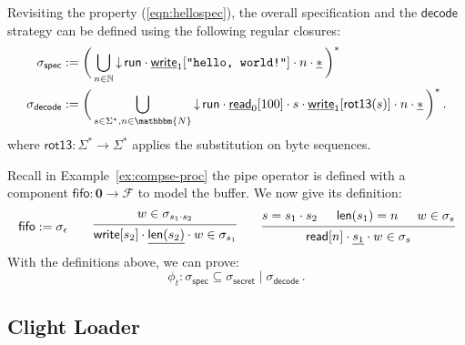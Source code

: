 \documentclass[acmsmall,screen,review,anonymous,nonacm]{acmart}
\newcommand{\kw}[1]{\ensuremath{ \mathsf{#1} }}
\begin{document}
\begin{example}
Revisiting the property (\ref{eqn:hellospec}),
the overall specification
and
the $\kw{decode}$ strategy
can be defined using
the following regular closures:
\begin{align*}
  \sigma_\kw{spec} & :=
    \biggl( \,
      \bigcup_{n \in \mathbb{N}}
      {\downarrow} \,
      \kw{run} \cdot \underline{\kw{write}}_1[\texttt{"hello, world!"}]
               \cdot n \cdot \underline{*}
    \, \biggr)^*
\\
  \sigma_\kw{decode} & :=
    \biggl( \,
      \bigcup_{s \in \Sigma^*, n \in \mathbbm{N}}
      {\downarrow} \,
      \kw{run}
      \cdot \underline{\kw{read}}_0[100]
      \cdot s
      \cdot \underline{\kw{write}}_1[\kw{rot13}(s)]
      \cdot n \cdot \underline{*}
    \, \biggr)^*
  \,.
\end{align*}
where $\kw{rot13}: \Sigma^* \rightarrow \Sigma^*$
applies the substitution on byte sequences.

Recall in Example~\ref{ex:compse-proc}
the pipe operator
is defined with
a component $\kw{fifo} : \mathbf{0} \rightarrow \mathcal{F}$ to model
the buffer.
We now give its definition:
\[
  \kw{fifo} := \sigma_\epsilon
  \qquad
  \begin{prooftree}
    \hypo{w \in \sigma_{s_1 \cdot s_2}}
    \infer1{\kw{write}[s_2] \cdot \underline{\kw{len}(s_2)} \cdot w \in \sigma_{s_1}}
  \end{prooftree}
  \qquad
  \begin{prooftree}
    \hypo{s = s_1 \cdot s_2}
    \hypo{\kw{len}(s_1) = n}
    \hypo{w \in \sigma_s}
    \infer3{\kw{read}[n] \cdot \underline{s_1} \cdot w \in \sigma_s}
  \end{prooftree}
\]
With the definitions above,
we can prove:
\[
  \phi_t: \sigma_\kw{spec} \subseteq \sigma_\kw{secret} \mid \sigma_\kw{decode}
  \,.
\]
\end{example}

\subsection{Clight Loader}
\end{document}
